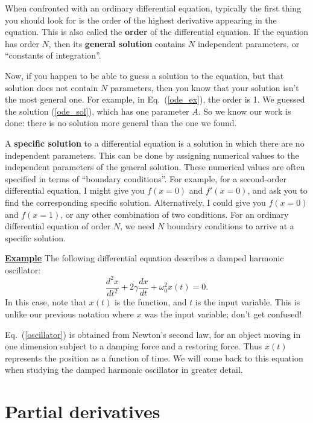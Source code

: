 \documentclass[10pt,a4paper]{article}
\begin{document}
When confronted with an ordinary differential equation, typically the
first thing you should look for is the order of the highest derivative
appearing in the equation.  This is also called the \textbf{order} of
the differential equation. If the equation has order $N$, then its
\textbf{general solution} contains $N$ independent parameters, or
``constants of integration''.

Now, if you happen to be able to guess a solution to the equation, but
that solution does not contain $N$ parameters, then you know that your
solution isn't the most general one.  For example, in
Eq.~(\ref{ode_ex}), the order is 1.  We guessed the solution
(\ref{ode_sol}), which has one parameter $A$. So we know our work is
done: there is no solution more general than the one we found.

A \textbf{specific solution} to a differential equation is a solution in
which there are no independent parameters. This can be done by assigning
numerical values to the independent parameters of the general solution.
These numerical values are often specified in terms of ``boundary
conditions''. For example, for a second-order differential equation, I
might give you $f(x = 0)$ and $f'(x = 0)$, and ask you to find the
corresponding specific solution. Alternatively, I could give you
$f(x = 0)$ and $f(x = 1)$, or any other combination of two
conditions. For an ordinary differential equation of order $N$, we
need $N$ boundary conditions to arrive at a specific solution.

\begin{framed}
\noindent
\underline{\textbf{Example}}
\vskip 0.1in \noindent
The following differential equation describes a damped harmonic
oscillator:
\begin{equation}
  \frac{d^2 x}{dt^2} + 2\gamma\frac{dx}{dt} + \omega_0^2 x(t) = 0.
  \label{oscillator}
\end{equation}
In this case, note that $x(t)$ is the function, and $t$ is the input
variable.  This is unlike our previous notation where $x$ was the
input variable; don't get confused!

Eq.~(\ref{oscillator}) is obtained from Newton's second law, for an
object moving in one dimension subject to a damping force and a
restoring force. Thus $x(t)$ represents the position as a function of
time. We will come back to this equation when studying the damped
harmonic oscillator in greater detail.
\end{framed}

\section{Partial derivatives}
\label{partial-derivatives}
\end{document}
